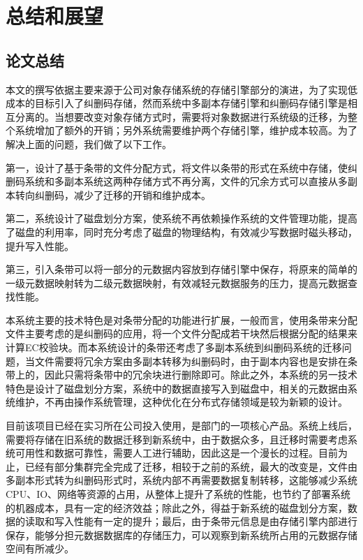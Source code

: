 
\chapter{总结和展望}
\section{论文总结}%
本文的撰写依据主要来源于公司对象存储系统的存储引擎部分的演进，为了实现低成本的目标引入了纠删码存储，然而系统中多副本存储引擎和纠删码存储引擎是相互分离的。当想要改变对象存储方式时，需要将对象数据进行系统级的迁移，为整个系统增加了额外的开销；另外系统需要维护两个存储引擎，维护成本较高。为了解决上面的问题，我们做了以下工作。

第一，设计了基于条带的文件分配方式，将文件以条带的形式在系统中存储，使纠删码系统和多副本系统这两种存储方式不再分离，文件的冗余方式可以直接从多副本转向纠删码，减少了迁移的开销和维护成本。

第二，系统设计了磁盘划分方案，使系统不再依赖操作系统的文件管理功能，提高了磁盘的利用率，同时充分考虑了磁盘的物理结构，有效减少写数据时磁头移动，提升写入性能。

第三，引入条带可以将一部分的元数据内容放到存储引擎中保存，将原来的简单的一级元数据映射转为二级元数据映射，有效减轻元数据服务的压力，提高元数据查找性能。

本系统主要的技术特色是对条带分配的功能进行扩展，一般而言，使用条带来分配文件主要考虑的是纠删码的应用，将一个文件分配成若干块然后根据分配的结果来计算EC校验块。而本系统设计的条带还考虑了多副本系统到纠删码系统的迁移问题，当文件需要将冗余方案由多副本转移为纠删码时，由于副本内容也是安排在条带上的，因此只需将条带中的冗余块进行删除即可。除此之外，本系统的另一技术特色是设计了磁盘划分方案，系统中的数据直接写入到磁盘中，相关的元数据由系统维护，不再由操作系统管理，这种优化在分布式存储领域是较为新颖的设计。

目前该项目已经在实习所在公司投入使用，是部门的一项核心产品。系统上线后，需要将存储在旧系统的数据迁移到新系统中，由于数据众多，且迁移时需要考虑系统可用性和数据可靠性，需要人工进行辅助，因此这是一个漫长的过程。目前为止，已经有部分集群完全完成了迁移，相较于之前的系统，最大的改变是，文件由多副本形式转为纠删码形式时，系统内部不再需要数据复制转移，这能够减少系统CPU、IO、网络等资源的占用，从整体上提升了系统的性能，也节约了部署系统的机器成本，具有一定的经济效益；除此之外，得益于新系统的磁盘划分方案，数据的读取和写入性能有一定的提升；最后，由于条带元信息是由存储引擎内部进行保存，能够分担元数据数据库的存储压力，可以观察到新系统所占用的元数据存储空间有所减少。

